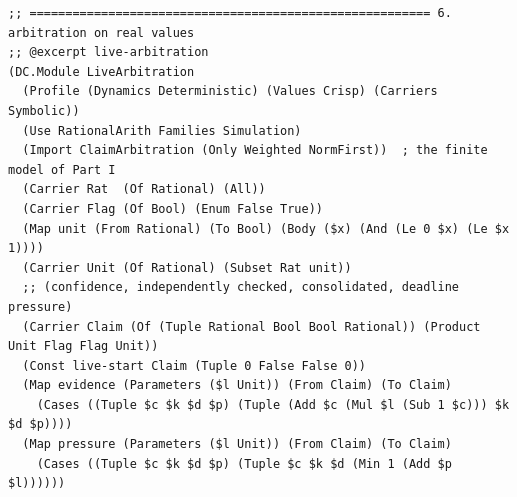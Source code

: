 \documentclass[11pt]{article}
\theoremstyle{definition}
\theoremstyle{plain}
\begin{document}
\begin{lstlisting}[style=mettafull]
;; ======================================================== 6. arbitration on real values
;; @excerpt live-arbitration
(DC.Module LiveArbitration
  (Profile (Dynamics Deterministic) (Values Crisp) (Carriers Symbolic))
  (Use RationalArith Families Simulation)
  (Import ClaimArbitration (Only Weighted NormFirst))  ; the finite model of Part I
  (Carrier Rat  (Of Rational) (All))
  (Carrier Flag (Of Bool) (Enum False True))
  (Map unit (From Rational) (To Bool) (Body ($x) (And (Le 0 $x) (Le $x 1))))
  (Carrier Unit (Of Rational) (Subset Rat unit))
  ;; (confidence, independently checked, consolidated, deadline pressure)
  (Carrier Claim (Of (Tuple Rational Bool Bool Rational)) (Product Unit Flag Flag Unit))
  (Const live-start Claim (Tuple 0 False False 0))
  (Map evidence (Parameters ($l Unit)) (From Claim) (To Claim)
    (Cases ((Tuple $c $k $d $p) (Tuple (Add $c (Mul $l (Sub 1 $c))) $k $d $p))))
  (Map pressure (Parameters ($l Unit)) (From Claim) (To Claim)
    (Cases ((Tuple $c $k $d $p) (Tuple $c $k $d (Min 1 (Add $p $l))))))


\end{lstlisting}
\end{document}
